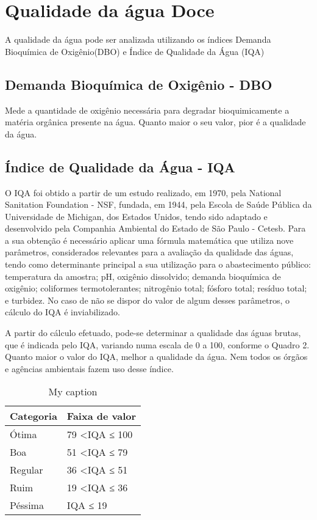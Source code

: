 \section{Qualidade da água Doce}
A qualidade da água pode ser analizada utilizando os índices Demanda Bioquímica de Oxigênio(DBO) e Índice de Qualidade da Água (IQA)

\subsection{Demanda Bioquímica de Oxigênio - DBO} Mede a quantidade de
oxigênio necessária para degradar bioquimicamente a matéria orgânica presente
na água. Quanto maior o seu valor, pior é a qualidade da água.

\subsection{ Índice de Qualidade da Água - IQA} O IQA foi obtido a partir de um estudo realizado, em 1970, pela National Sanitation Foundation - NSF, fundada, em 1944, pela Escola de Saúde Pública da Universidade de Michigan, dos Estados Unidos, tendo sido adaptado e desenvolvido pela Companhia Ambiental do Estado de São Paulo - Cetesb. Para a sua obtenção é necessário aplicar uma fórmula matemática que utiliza nove parâmetros, considerados relevantes para a avaliação da qualidade das águas, tendo como determinante principal a sua utilização para o abastecimento público: temperatura da amostra; pH, oxigênio dissolvido; demanda bioquímica de oxigênio; coliformes termotolerantes; nitrogênio total; fósforo total; resíduo total; e turbidez. No caso de não se dispor do valor de algum desses parâmetros, o cálculo do IQA é inviabilizado.

A partir do cálculo efetuado, pode-se determinar a qualidade das águas brutas, que é indicada pelo IQA, variando numa escala de 0 a 100, conforme o Quadro 2. Quanto maior o valor do IQA, melhor a qualidade da água. Nem todos os órgãos e agências ambientais fazem uso desse índice.

\begin{table}[]
	\centering
	\caption{My caption}
	\label{my-label}
	\begin{tabular}{@{}ll@{}}
		\toprule
		\multicolumn{1}{r}{Categoria} & Faixa de valor         \\ \midrule
		Ótima                         & 79 \textless IQA ≤ 100 \\
		Boa                           & 51 \textless IQA ≤ 79  \\
		Regular                       & 36 \textless IQA ≤ 51  \\
		Ruim                          & 19 \textless IQA ≤ 36  \\
		Péssima                       & IQA ≤ 19               \\ \bottomrule
	\end{tabular}
\end{table}

